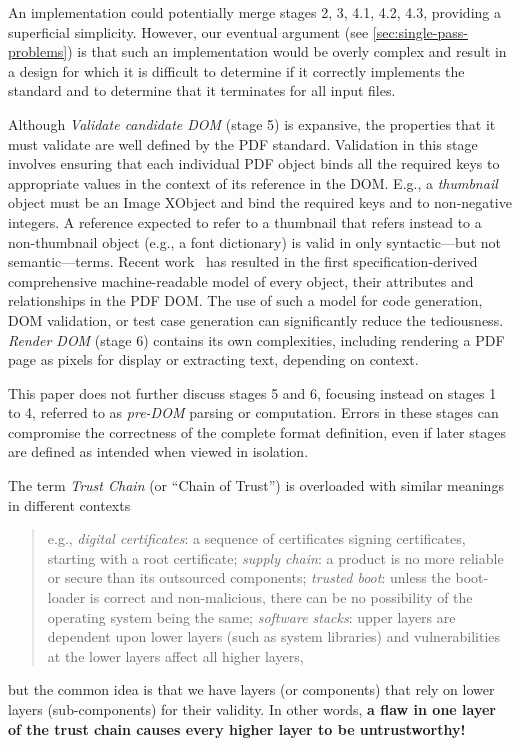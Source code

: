 An implementation could potentially merge stages 2, 3, 4.1, 4.2, 4.3,
providing a superficial simplicity.
%
However, our eventual argument (see \cref{sec:single-pass-problems})
is that such an implementation would be overly complex and result in a
design for which it is difficult to determine if it correctly
implements the standard and to determine that it terminates for all
input files.

%
Although \emph{Validate candidate DOM} (stage 5) is expansive, the
properties that it must validate are well defined by the 
PDF standard.
%
Validation in this stage involves ensuring that each individual PDF
object binds all the required keys to appropriate values in the context
of its reference in the DOM.
%
E.g., a \emph{thumbnail} object must be an Image XObject and bind the
required keys  and  to non-negative
integers.
%
A reference expected to refer to a thumbnail that refers instead to a
non-thumbnail object (e.g., a font dictionary) is valid in only
syntactic---but not semantic---terms.
%
Recent work~\cite{peterwyattArlingtonPDFModel2021} has resulted in the
first specification-derived comprehensive machine-readable model of
every object, their attributes and relationships in the PDF DOM. The
use of such a model for code generation, DOM validation, or test case
generation can significantly reduce the tediousness.
%
\emph{Render DOM} (stage 6) contains its own complexities, including
rendering a PDF page as pixels for display or extracting text,
depending on context.

%
This paper does not further discuss stages 5 and 6, focusing instead
on stages 1 to 4, referred to as \emph{pre-DOM} parsing or
computation.
%
Errors in these stages can compromise the correctness of the complete
format definition, even if later stages are defined as intended when
viewed in isolation.



The term \emph{Trust Chain} (or ``Chain of Trust'') is
overloaded with similar meanings in different contexts
%
%
\begin{quote}
e.g.,
\emph{digital certificates}: a sequence of certificates signing certificates,
starting with a root certificate;
\emph{supply chain}: a product is no more reliable or secure than its
outsourced components;
\emph{trusted boot}: unless the boot-loader is correct and non-malicious,
there can be no possibility of the operating system being the same;
\emph{software stacks}: upper layers are dependent upon lower layers (such as
system libraries) and vulnerabilities at the lower layers affect all higher
layers,
\end{quote}
but the common idea is that we have layers (or components) that rely
on lower layers (sub-components) for their validity.  In other words,
{\textbf{a flaw in one layer of the trust chain causes every higher
    layer to be untrustworthy!}}

